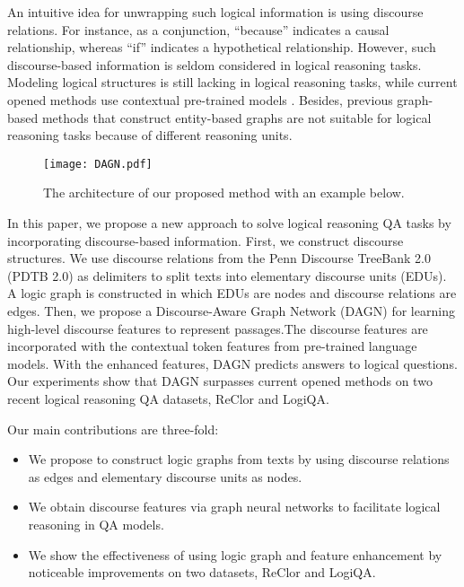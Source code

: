 \documentclass[11pt]{article}
\newcommand{\moe}[1]{{\color{black} #1}}
\begin{document}
An intuitive idea for unwrapping such logical information is \moe{using} discourse relations. For instance, 
\moe{as a conjunction, ``because'' indicates a causal relationship, whereas ``if'' indicates a hypothetical relationship.} However, such discourse-based information is seldom considered in logical reasoning tasks. 
\moe{Modeling logical structures is still lacking in logical reasoning tasks}, while current opened methods use contextual pre-trained models \cite{yu2020reclor}. \moe{Besides, previous graph-based methods \cite{ran2019numnet, chen2020question} that construct entity-based graphs are not suitable for logical reasoning tasks because of different reasoning units.}





\begin{figure*}[t!]
\setlength{\belowcaptionskip}{-0.35cm}
    \centering
    \texttt{[image: DAGN.pdf]}
    \caption{
    The architecture of our proposed method with an example below. 
    }
    \label{fig:model}
\end{figure*}

In this paper, we propose a new approach to solve logical reasoning QA tasks by incorporating 
discourse-based information.
First, \moe{we construct discourse structures}. We use discourse relations from the Penn Discourse TreeBank 2.0 (PDTB 2.0) \cite{prasad2008penn} as delimiters to split texts into elementary discourse units (EDUs). A logic graph is constructed in which EDUs are nodes and discourse relations are edges.
Then, we propose a Discourse-Aware Graph Network (DAGN) for learning high-level discourse features \moe{to represent passages.}The discourse features are incorporated with the contextual token features from pre-trained language models.
With the enhanced features, DAGN predicts answers to logical questions.
Our experiments show that DAGN surpasses current opened methods
on two \moe{recent} logical reasoning QA datasets, ReClor and LogiQA.










Our main contributions are three-fold:
\begin{itemize}
\item We propose to construct logic graphs from texts by using discourse relations as edges and elementary discourse units as nodes. 
\item We obtain discourse features via graph neural networks to facilitate logical reasoning in QA models. 
\item We show the effectiveness of using logic graph and feature enhancement by noticeable improvements on two datasets, ReClor and LogiQA.
\end{itemize}
\end{document}
